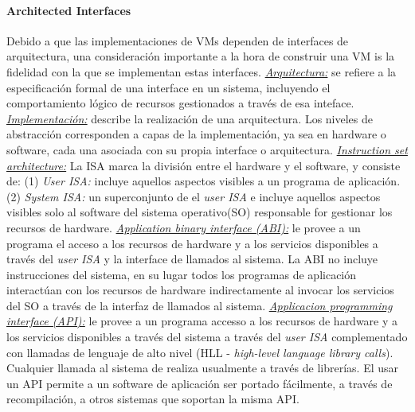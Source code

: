 \paragraph{\textnormal{\textbf{Architected Interfaces}}}
Debido a que las implementaciones de VMs dependen de interfaces de arquitectura, una consideración importante a la hora de construir una VM is la fidelidad con la que se implementan estas interfaces. \underline{\textit{Arquitectura:}} se refiere a la especificación formal de una interface en un sistema, incluyendo el comportamiento lógico de recursos gestionados a través de esa inteface. \underline{\textit{Implementación:}} describe la realización de una arquitectura. Los niveles de abstracción corresponden a capas de la implementación, ya sea en hardware o software, cada una asociada con su propia interface o arquitectura. \underline{\textit{Instruction set architecture:}} La ISA marca la división entre el hardware y el software, y consiste de: (1) \emph{User ISA:} incluye aquellos aspectos visibles a un programa de aplicación.(2) \emph{System ISA:} un superconjunto de el \emph{user ISA} e incluye aquellos aspectos visibles solo al software del sistema operativo(SO) responsable for gestionar los recursos de hardware. \underline{\textit{Application binary interface (ABI):}} le provee a un programa el acceso a los recursos de hardware y a los servicios disponibles a través del \emph{user ISA } y la interface de llamados al sistema. La ABI no incluye instrucciones del sistema, en su lugar todos los programas de aplicación interactúan con los recursos de hardware indirectamente al invocar los servicios del SO a través de la interfaz de llamados al sistema. \underline{\textit{Applicacion programming interface (API):}} le provee a un programa accesso a los recursos de hardware y a los servicios disponibles a través del sistema a través del \emph{user ISA} complementado con llamadas de lenguaje de alto nivel (HLL - \textit{high-level language library calls}). Cualquier llamada al sistema de realiza usualmente a través de librerías. El usar un API permite a un software de aplicación ser portado fácilmente, a través de recompilación, a otros sistemas que soportan la misma API.

